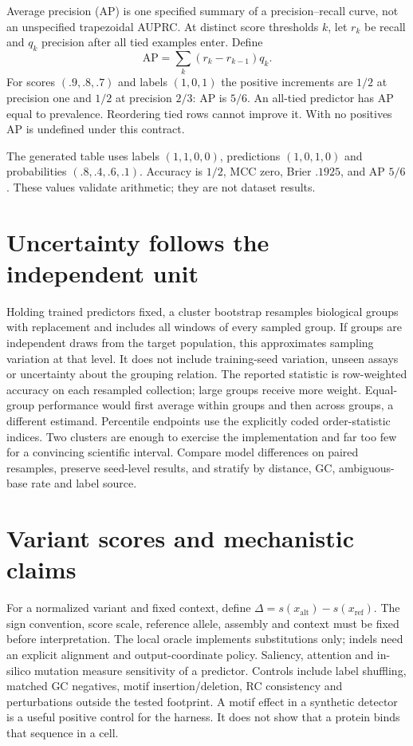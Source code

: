 Average precision (AP) is one specified summary of a precision--recall curve,
not an unspecified trapezoidal AUPRC. At distinct score thresholds $k$, let
$r_k$ be recall and $q_k$ precision after all tied examples enter. Define
\begin{equation}\label{evod48:ap}
\mathrm{AP}=\sum_k(r_k-r_{k-1})q_k.
\end{equation}
For scores $(.9,.8,.7)$ and labels $(1,0,1)$ the positive increments are
$1/2$ at precision one and $1/2$ at precision $2/3$: AP is $5/6$.
An all-tied predictor has AP equal to prevalence. Reordering tied rows cannot
improve it. With no positives AP is undefined under this contract.
\begin{center}\end{center}
The generated table uses labels $(1,1,0,0)$, predictions $(1,0,1,0)$ and
probabilities $(.8,.4,.6,.1)$. Accuracy is $1/2$, MCC zero, Brier $.1925$,
and AP $5/6$. These values validate arithmetic; they are not dataset results.

\section{Uncertainty follows the independent unit}
Holding trained predictors fixed, a cluster bootstrap resamples biological
groups with replacement and includes all windows of every sampled group.
If groups are independent draws from the target population, this approximates
sampling variation at that level. It does not include training-seed variation,
unseen assays or uncertainty about the grouping relation.
The reported statistic is row-weighted accuracy on each resampled collection;
large groups receive more weight. Equal-group performance would first average
within groups and then across groups, a different estimand. Percentile endpoints
use the explicitly coded order-statistic indices. Two clusters are enough to
exercise the implementation and far too few for a convincing scientific
interval. Compare model differences on paired resamples, preserve seed-level
results, and stratify by distance, GC, ambiguous-base rate and label source.

\section{Variant scores and mechanistic claims}
For a normalized variant and fixed context, define
$\Delta=s(x_{\mathrm{alt}})-s(x_{\mathrm{ref}})$.
The sign convention, score scale, reference allele, assembly and context must
be fixed before interpretation. The local oracle implements substitutions only;
indels need an explicit alignment and output-coordinate policy.
Saliency, attention and in-silico mutation measure sensitivity of a predictor.
Controls include label shuffling, matched GC negatives, motif insertion/deletion,
RC consistency and perturbations outside the tested footprint. A motif effect
in a synthetic detector is a useful positive control for the harness. It does
not show that a protein binds that sequence in a cell.

